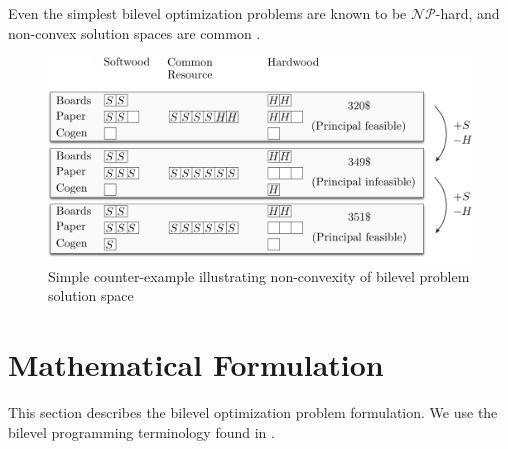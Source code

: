Even the simplest bilevel optimization problems are known to be $\mathcal{NP}$-hard, and non-convex solution spaces are common \citep{dempe2003annotated, colson2007overview}. 



\begin{figure}[H]
  \centering
  \includegraphics[width=\textwidth]{images/counterexample_edited2}
  \caption{Simple counter-example illustrating non-convexity of bilevel problem solution space}
  \label{fig:counterexample}
\end{figure}


%


\section{Mathematical Formulation}
\label{sec:formulation2}

This section describes the bilevel optimization problem formulation. We use the bilevel programming terminology found in \citet{colson2007overview}.

